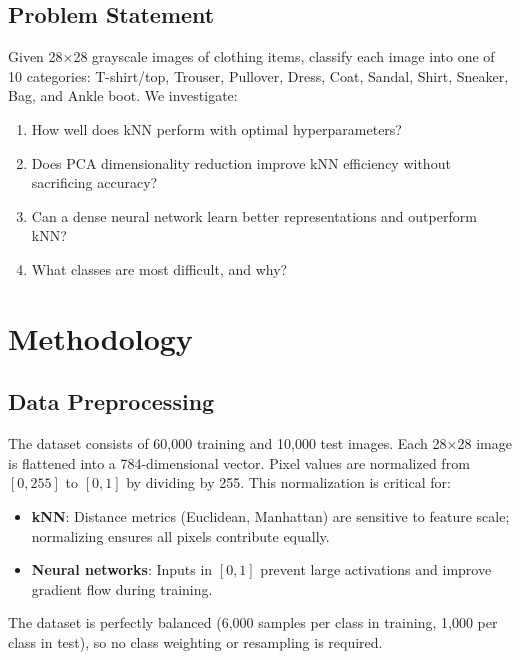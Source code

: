 \documentclass[11pt]{article}
\begin{document}
\subsection{Problem Statement}
Given 28$\times$28 grayscale images of clothing items, classify each image into one of 10 categories: T-shirt/top, Trouser, Pullover, Dress, Coat, Sandal, Shirt, Sneaker, Bag, and Ankle boot. We investigate:
\begin{enumerate}[nosep]
	\item How well does kNN perform with optimal hyperparameters?
	\item Does PCA dimensionality reduction improve kNN efficiency without sacrificing accuracy?
	\item Can a dense neural network learn better representations and outperform kNN?
	\item What classes are most difficult, and why?
\end{enumerate}

\section{Methodology}

\subsection{Data Preprocessing}
The dataset consists of 60,000 training and 10,000 test images. Each 28$\times$28 image is flattened into a 784-dimensional vector. Pixel values are normalized from $[0, 255]$ to $[0, 1]$ by dividing by 255. This normalization is critical for:
\begin{itemize}[nosep]
	\item \textbf{kNN}: Distance metrics (Euclidean, Manhattan) are sensitive to feature scale; normalizing ensures all pixels contribute equally.
	\item \textbf{Neural networks}: Inputs in $[0, 1]$ prevent large activations and improve gradient flow during training.
\end{itemize}
The dataset is perfectly balanced (6,000 samples per class in training, 1,000 per class in test), so no class weighting or resampling is required.
\end{document}
